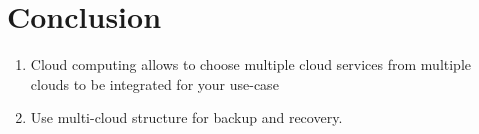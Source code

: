\chapter{Conclusion}\label{chap:conclusion}

 \begin{enumerate} 
 	\item Cloud computing allows  to choose multiple cloud services from multiple clouds to be integrated for your use-case 
 	\item Use multi-cloud structure for backup and recovery. 
 \end{enumerate}